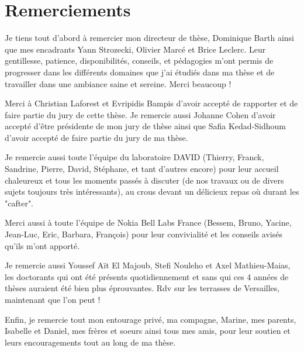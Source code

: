 \section*{Remerciements}

Je tiens tout d’abord à remercier mon directeur de thèse, Dominique Barth ainsi que mes encadrants Yann Strozecki, Olivier Marcé et Brice Leclerc. Leur gentillesse, patience, disponibilités, conseils, et pédagogies m’ont permis de progresser dans les différents domaines que j’ai étudiés dans ma thèse et de travailler dans une ambiance saine et sereine. Merci beaucoup !

Merci à Christian Laforest et Evripidis Bampis d'avoir accepté de rapporter et de faire partie du jury de cette thèse.
Je remercie aussi Johanne Cohen d'avoir accepté d'être présidente de mon jury de thèse ainsi que Safia Kedad-Sidhoum d'avoir accepté de faire partie du jury de ma thèse.

Je remercie aussi toute l’équipe du laboratoire DAVID (Thierry, Franck, Sandrine, Pierre, David, Stéphane, et tant d'autres encore) pour leur accueil chaleureux et tous les moments passés à discuter (de nos travaux ou de divers sujets toujours très intéressants), au crous devant un délicieux repas où durant les "cafter".

Merci aussi à toute l’équipe de Nokia Bell Labs France (Bessem, Bruno, Yacine, Jean-Luc, Eric, Barbara, François) pour leur convivialité et les conseils avisés qu’ils m’ont apporté.

Je remercie aussi Youssef Aït El Majoub, Stefi Nouleho et Axel Mathieu-Maias, les doctorants qui ont été présents quotidiennement et sans qui ces 4 années de thèses auraient été bien plus éprouvantes. Rdv sur les terrasses de Versailles, maintenant que l'on peut !

Enfin, je remercie tout mon entourage privé, ma compagne, Marine, mes parents, Isabelle et Daniel, mes frères et soeurs ainsi tous mes amis, pour leur soutien et leurs encouragements tout au long de ma thèse. 